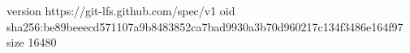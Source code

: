 version https://git-lfs.github.com/spec/v1
oid sha256:be89beeecd571107a9b8483852ca7bad9930a3b70d960217c134f3486e164f97
size 16480
